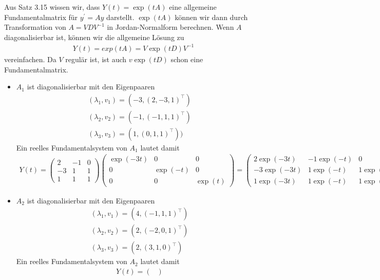 \begin{solution}
Aus Satz 3.15 wissen wir, dass $Y(t) = \exp(tA)$ eine allgemeine Fundamentalmatrix für $y^{\prime} = Ay$
darstellt. $\exp(tA)$ können wir dann durch Transformation von $A = VDV^{-1}$ in Jordan-Normalform berechnen.
Wenn $A$ diagonalisierbar ist, können wir die allgemeine Lösung zu
\begin{align*}
  Y(t) = exp(tA) = V\exp(tD)V^{-1}
\end{align*}
vereinfachen. Da $V$ regulär ist, ist auch $v\exp(tD)$ schon eine Fundamentalmatrix.
\begin{itemize}
  \item $A_1$ ist diagonalisierbar mit den Eigenpaaren
  \begin{align*}
  (\lambda_1,v_1) = (-3,(2,-3,1)^{\top})\\
  (\lambda_2,v_2) = (-1,(-1,1,1)^{\top}) \\
  (\lambda_3,v_3) = (1,(0,1,1)^{\top}))
  \end{align*}
  Ein reelles Fundamentalsystem von $A_1$ lautet damit
  \begin{align*}
    Y(t) = \begin{pmatrix}
      2 & -1 & 0 \\ -3 & 1 & 1 \\ 1 & 1 & 1
    \end{pmatrix}
    \begin{pmatrix}
      \exp(-3t) & 0 & 0 \\
      0 & \exp(-t) & 0 \\
      0 & 0 & \exp(t)
    \end{pmatrix} =
    \begin{pmatrix}
      2\exp(-3t) & -1\exp(-t) & 0 \\
      -3\exp(-3t) & 1\exp(-t) & 1\exp(t) \\
      1\exp(-3t) & 1\exp(-t) & 1\exp(t)
    \end{pmatrix}.
  \end{align*}
  \item $A_2$ ist diagonalisierbar mit den Eigenpaaren
  \begin{align*}
  (\lambda_1,v_1) = (4,(-1,1,1)^{\top}) \\
  (\lambda_2,v_2) = (2,(-2,0,1)^{\top}) \\
  (\lambda_3,v_3) = (2,(3,1,0)^{\top})
  \end{align*}
  Ein reelles Fundamentalsystem von $A_2$ lautet damit
  \begin{align*}
    Y(t) = \begin{pmatrix}

\end{pmatrix}
\end{align*}
\end{itemize}
\end{solution}
